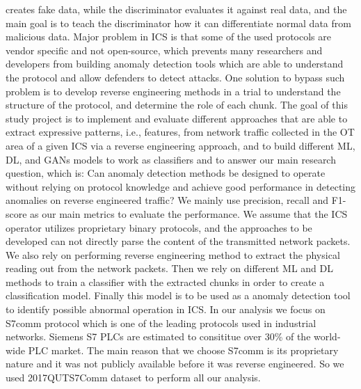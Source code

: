 creates fake data, while the discriminator evaluates it against real data, and the main goal is to teach the discriminator how it can differentiate normal data from malicious data. Major problem in \ac{ICS} is that some of the used protocols are vendor specific and not open-source, which prevents many researchers and developers from building anomaly detection tools which are able to understand the protocol and allow defenders to detect attacks. One solution to bypass such problem is to develop reverse engineering methods in a trial to understand the structure of the protocol, and determine the role of each chunk. The goal of this study project is to implement and evaluate different approaches that are able to extract expressive patterns, i.e., features, from network traffic collected in the \ac{OT} area of a given \ac{ICS} via a reverse engineering approach, and to build different \ac{ML}, \ac{DL}, and \ac{GANs} models to work as classifiers and to answer our main research question, which is: Can anomaly detection methods be designed to operate without relying on protocol knowledge and achieve good performance in detecting anomalies on reverse engineered traffic? We mainly use precision, recall and F1-score as our main metrics to evaluate the performance. We assume that the \ac{ICS} operator utilizes proprietary binary protocols, and the approaches to be developed can not directly parse the content of the transmitted network packets. We also rely on performing reverse engineering method to extract the physical reading out from the network packets. Then we rely on different \ac{ML} and \ac{DL} methods to train a classifier with the extracted chunks in order to create a classification model. Finally this model is to be used as a anomaly detection tool to identify possible abnormal operation in \ac{ICS}.  In our analysis we focus on \ac{S7comm} protocol which is one of the leading protocols used in industrial networks. Siemens S7 \ac{PLCs} are estimated to consititue over 30\% of the world-wide PLC market. The main reason that we choose \ac{S7comm} is its proprietary nature and it was not publicly available before it was reverse engineered. So we used 2017QUTS7Comm dataset to perform all our analysis. 




